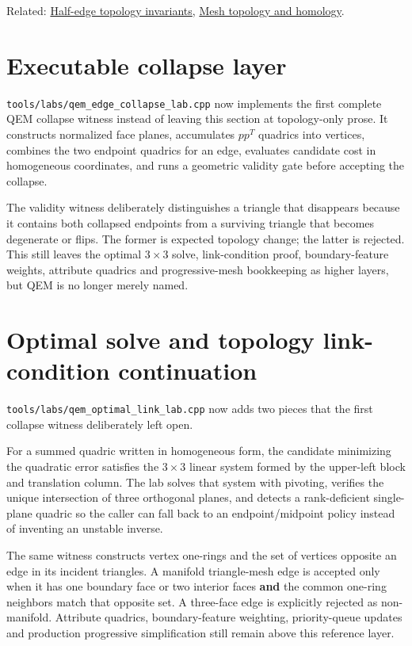 Related: \hyperref[appendix-faac749c9cdd]{Half-edge topology invariants}, \hyperref[appendix-e38976cbbf86]{Mesh topology and homology}.

\section{Executable collapse layer}\label{appendix-89db9fe1bc8a-executable-collapse-layer}

\texttt{tools/labs/qem\_edge\_collapse\_lab.cpp} now implements the first complete QEM collapse witness instead of leaving this section at topology-only prose. It constructs normalized face planes, accumulates \(pp^T\) quadrics into vertices, combines the two endpoint quadrics for an edge, evaluates candidate cost in homogeneous coordinates, and runs a geometric validity gate before accepting the collapse.

The validity witness deliberately distinguishes a triangle that disappears because it contains both collapsed endpoints from a surviving triangle that becomes degenerate or flips. The former is expected topology change; the latter is rejected. This still leaves the optimal \(3\times3\) solve, link-condition proof, boundary-feature weights, attribute quadrics and progressive-mesh bookkeeping as higher layers, but QEM is no longer merely named.

\section{Optimal solve and topology link-condition continuation}\label{appendix-89db9fe1bc8a-optimal-solve-and-topology-link-condition-continuation}

\texttt{tools/labs/qem\_optimal\_link\_lab.cpp} now adds two pieces that the first collapse witness deliberately left open.

For a summed quadric written in homogeneous form, the candidate minimizing the quadratic error satisfies the \(3\times3\) linear system formed by the upper-left block and translation column. The lab solves that system with pivoting, verifies the unique intersection of three orthogonal planes, and detects a rank-deficient single-plane quadric so the caller can fall back to an endpoint/midpoint policy instead of inventing an unstable inverse.

The same witness constructs vertex one-rings and the set of vertices opposite an edge in its incident triangles. A manifold triangle-mesh edge is accepted only when it has one boundary face or two interior faces \textbf{and} the common one-ring neighbors match that opposite set. A three-face edge is explicitly rejected as non-manifold. Attribute quadrics, boundary-feature weighting, priority-queue updates and production progressive simplification still remain above this reference layer.

